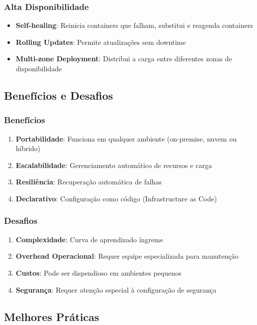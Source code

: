 \subsubsection{Alta Disponibilidade}
\begin{itemize}
\item \textbf{Self-healing}: Reinicia containers que falham, substitui e reagenda containers
\item \textbf{Rolling Updates}: Permite atualizações sem downtime
\item \textbf{Multi-zone Deployment}: Distribui a carga entre diferentes zonas de disponibilidade
\end{itemize}

\subsection{Benefícios e Desafios}

\subsubsection{Benefícios}
\begin{enumerate}
\item \textbf{Portabilidade}: Funciona em qualquer ambiente (on-premise, nuvem ou híbrido)
\item \textbf{Escalabilidade}: Gerenciamento automático de recursos e carga
\item \textbf{Resiliência}: Recuperação automática de falhas
\item \textbf{Declarativo}: Configuração como código (Infrastructure as Code)
\end{enumerate}

\subsubsection{Desafios}
\begin{enumerate}
\item \textbf{Complexidade}: Curva de aprendizado íngreme
\item \textbf{Overhead Operacional}: Requer equipe especializada para manutenção
\item \textbf{Custos}: Pode ser dispendioso em ambientes pequenos
\item \textbf{Segurança}: Requer atenção especial à configuração de segurança
\end{enumerate}

\subsection{Melhores Práticas}

